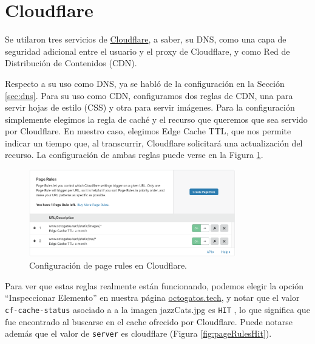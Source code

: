 \documentclass{article}
\newcommand{\ttt}[1]{%
\texttt{#1}%
}
\begin{document}


\section{Cloudflare}

Se utilaron tres servicios de
\href{https://www.cloudflare.com/}{Cloudflare}, a saber,
su DNS, como una capa de seguridad adicional entre el
usuario y el proxy de Cloudflare, y como Red de
Distribuci\'on de Contenidos (CDN).

Respecto a su uso como DNS, ya se habl\'o de la
configuraci\'on en la Secci\'on \ref{sec:dns}.   Para
su uso como CDN, configuramos dos reglas de CDN, una
para servir hojas de estilo (CSS) y otra para servir
im\'agenes.   Para la configuraci\'on simplemente
elegimos la regla de cach\'e y el recurso que queremos
que sea servido por Cloudflare.   En nuestro caso,
elegimos Edge Cache TTL, que nos permite indicar
un tiempo que, al transcurrir, Cloudflare solicitar\'a
una actualizaci\'on del recurso.   La configuraci\'on
de ambas reglas puede verse en la Figura
\ref{fig:pageRules}.

\begin{figure}[H]
  \centering
  \includegraphics[width=0.8\textwidth]{cloudflare/pageRules}
  \caption{Configuraci\'on de page rules en Cloudflare.}
  \label{fig:pageRules}
\end{figure}

Para ver que estas reglas realmente est\'an funcionando,
podemos elegir la opci\'on ``Inspeccionar Elemento'' en
nuestra p\'agina \href{https://octogatos.tech}{octogatos.tech},
y notar que el valor \ttt{cf-cache-status} asociado a
a la imagen jazzCats.jpg es \ttt{HIT}, lo que significa que
fue encontrado al buscarse en el cache ofrecido por Cloudflare.
Puede notarse adem\'as que el valor de \ttt{server} es
cloudflare (Figura \ref{fig:pageRulesHit}).
\end{document}
